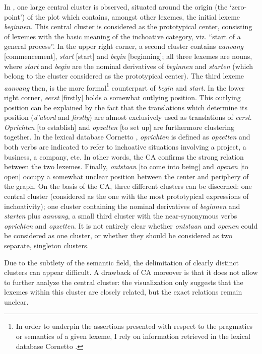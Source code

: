 In , one large central cluster is observed, situated around the origin (the ‘zero-point’) of the plot which contains, amongst other lexemes, the initial lexeme \textit{beginnen}. This central cluster is considered as the prototypical center, consisting of lexemes with the basic meaning of the inchoative category, viz. “start of a general process”. In the upper right corner, a second cluster contains \textit{aanvang} [commencement], \textit{start} [start] and \textit{begin} [beginning]; all three lexemes are nouns, where \textit{start} and \textit{begin} are the nominal derivatives of \textit{beginnen} and \textit{starten} (which belong to the cluster considered as the prototypical center). The third lexeme \textit{aanvang} then, is the more formal\footnote{In order to underpin the assertions presented with respect to the pragmatics or semantics of a given lexeme, I rely on information retrieved in the lexical database Cornetto \citep{spyns_cornetto:_2013}.} counterpart of \textit{begin} and \textit{start}. In the lower right corner, \textit{eerst} [firstly] holds a somewhat outlying position. This outlying position can be explained by the fact that the translations which determine its position (\textit{d’abord} and \textit{firstly}) are almost exclusively used as translations of \textit{eerst}. \textit{Oprichten} [to establish] and \textit{opzetten} [to set up] are furthermore clustering together. In the lexical database Cornetto \citep{vossen_cornetto_2008, spyns_cornetto:_2013}, \textit{oprichten} is defined as \textit{opzetten} and both verbs are indicated to refer to inchoative situations involving a project, a business, a company, etc. In other words, the CA confirms the strong relation between the two lexemes. Finally, \textit{ontstaan} [to come into being] and \textit{openen} [to open] occupy a somewhat unclear position between the center and periphery of the graph. On the basis of the CA, three different clusters can be discerned: one central cluster (considered as the one with the most prototypical expressions of inchoativity); one cluster containing the nominal derivatives of \textit{beginnen} and \textit{starten} plus \textit{aanvang}, a small third cluster with the near-synonymous verbs \textit{oprichten} and \textit{opzetten}. It is not entirely clear whether \textit{ontstaan} and \textit{openen} could be considered as one cluster, or whether they should be considered as two separate, singleton clusters.

Due to the subtlety of the semantic field, the delimitation of clearly distinct clusters can appear difficult. A drawback of CA moreover is that it does not allow to further analyze the central cluster: the visualization only suggests that the lexemes within this cluster are closely related, but the exact relations remain unclear.

